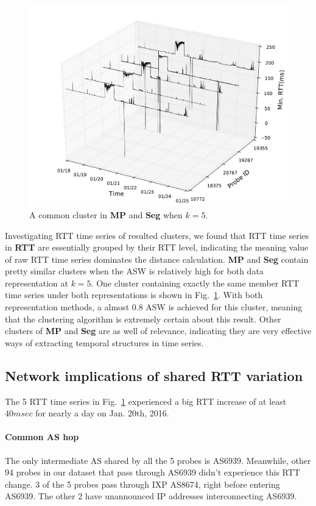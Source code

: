 \begin{figure}[!htb]
\centering
\includegraphics[width=.9\textwidth]{gfx/chap3/rtt3d_mp_cls2.pdf}
\caption{A common cluster in \textbf{MP} and \textbf{Seg} when $k=5$.}
\label{fig:rtt3d_mp_cls2}
\end{figure}

Investigating RTT time series of resulted clusters, we found that RTT time series in \textbf{RTT} are essentially grouped by their RTT level, indicating the meaning value of raw RTT time series dominates the distance calculation. \textbf{MP} and \textbf{Seg} contain pretty similar clusters when the \ac{ASW} is relatively high for both data representation at $k=5$. One cluster containing exactly the same member RTT time series under both representations is shown in Fig.~\ref{fig:rtt3d_mp_cls2}. With both representation methods, a almost 0.8 \ac{ASW} is achieved for this cluster, meaning that the clustering algorithm is extremely certain about this result. Other clusters of \textbf{MP} and \textbf{Seg} are as well of relevance, indicating they are very effective ways of extracting temporal structures in time series.

\subsection{Network implications of shared RTT variation}

The 5 RTT time series in Fig.~\ref{fig:rtt3d_mp_cls2} experienced a big RTT increase of at least $40msec$ for nearly a day on Jan. 20th, 2016.

\paragraph*{Common AS hop} The only intermediate AS shared by all the 5 probes is AS6939.
Meanwhile, other 94 probes in our dataset that pass through AS6939 didn't experience this RTT change.
3 of the 5 probes pass through IXP AS8674, right before entering AS6939.
The other 2 have unannounced IP addresses interconnecting AS6939.

